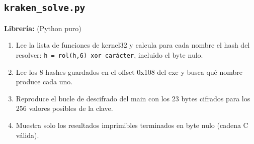 \documentclass[11pt,a4paper]{article}
\begin{document}
\subsection{\texttt{kraken\_solve.py}}
\textbf{Librería:} (Python puro)
\begin{enumerate}

\item Lee la lista de funciones de kernel32 y calcula para cada nombre el hash del resolver: \texttt{h = rol(h,6) xor carácter}, incluido el byte nulo.

\item Lee los 8 hashes guardados en el offset 0x108 del exe y busca qué nombre produce cada uno.

\item Reproduce el bucle de descifrado del main con los 23 bytes cifrados para los 256 valores posibles de la clave.

\item Muestra solo los resultados imprimibles terminados en byte nulo (cadena C válida).

\end{enumerate}
\end{document}
